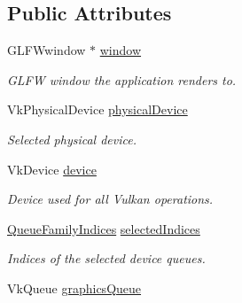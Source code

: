\subsection*{Public Attributes}
\begin{DoxyCompactItemize}
\item 
\mbox{\label{class_vulkan_context_ac1c5718ae7cdbcce4dec66cfacc3c7b2}} 
G\+L\+F\+Wwindow $\ast$ \mbox{\hyperlink{class_vulkan_context_ac1c5718ae7cdbcce4dec66cfacc3c7b2}{window}}
\begin{DoxyCompactList}\small\item\em G\+L\+FW window the application renders to. \end{DoxyCompactList}\item 
\mbox{\label{class_vulkan_context_a53a75b19d91d4626eefa0114b4e2af09}} 
Vk\+Physical\+Device \mbox{\hyperlink{class_vulkan_context_a53a75b19d91d4626eefa0114b4e2af09}{physical\+Device}}
\begin{DoxyCompactList}\small\item\em Selected physical device. \end{DoxyCompactList}\item 
\mbox{\label{class_vulkan_context_a6354038513569b86a28a70974d3520ac}} 
Vk\+Device \mbox{\hyperlink{class_vulkan_context_a6354038513569b86a28a70974d3520ac}{device}}
\begin{DoxyCompactList}\small\item\em Device used for all Vulkan operations. \end{DoxyCompactList}\item 
\mbox{\label{class_vulkan_context_a49f97c665dcc5253017e71b8a90359f6}} 
\mbox{\hyperlink{struct_queue_family_indices}{Queue\+Family\+Indices}} \mbox{\hyperlink{class_vulkan_context_a49f97c665dcc5253017e71b8a90359f6}{selected\+Indices}}
\begin{DoxyCompactList}\small\item\em Indices of the selected device queues. \end{DoxyCompactList}\item 
\mbox{\label{class_vulkan_context_a14646ba94cb79b85954aff4b079d7cb9}} 
Vk\+Queue \mbox{\hyperlink{class_vulkan_context_a14646ba94cb79b85954aff4b079d7cb9}{graphics\+Queue}}

\end{DoxyCompactItemize}
